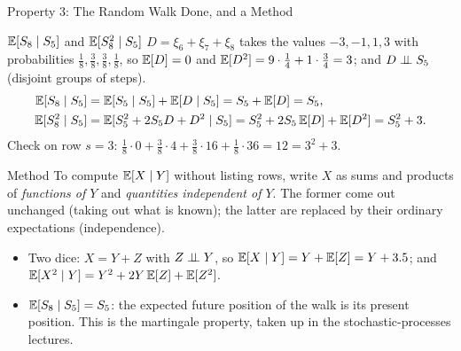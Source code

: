 \begin{frame}{Property 3: The Random Walk Done, and a Method}
  \small
  \label{rwdone}%
  \begin{exampleblock}{$\mathbb{E}[S_8\mid S_5]$ and $\mathbb{E}[S_8^2\mid S_5]$}
    $D=\xi_6+\xi_7+\xi_8$ takes the values $-3,-1,1,3$ with probabilities $\tfrac18,\tfrac38,\tfrac38,\tfrac18$, so $\mathbb{E}[D]=0$ and $\mathbb{E}[D^2]=9\cdot\tfrac14+1\cdot\tfrac34=3$; and $D\perp\!\!\!\perp S_5$ (disjoint groups of steps).
    \begin{align*}
      \mathbb{E}[S_8\mid S_5]&=\mathbb{E}[S_5\mid S_5]+\mathbb{E}[D\mid S_5]=S_5+\mathbb{E}[D]=S_5,\\
      \mathbb{E}[S_8^2\mid S_5]&=\mathbb{E}[S_5^2+2S_5D+D^2\mid S_5]=S_5^2+2S_5\,\mathbb{E}[D]+\mathbb{E}[D^2]=S_5^2+3 .
    \end{align*}
    Check on row $s=3$: $\tfrac18\cdot0+\tfrac38\cdot4+\tfrac38\cdot16+\tfrac18\cdot36=12=3^2+3$.
  \end{exampleblock}
  \begin{block}{Method}
    To compute $\mathbb{E}[X\mid Y]$ without listing rows, write $X$ as sums and products of \emph{functions of $Y$} and \emph{quantities independent of $Y$}. The former come out unchanged (taking out what is known); the latter are replaced by their ordinary expectations (independence).
  \end{block}
  \begin{itemize}
    \item Two dice: $X=Y+Z$ with $Z\perp\!\!\!\perp Y$, so $\mathbb{E}[X\mid Y]=Y+\mathbb{E}[Z]=Y+3.5$; and $\mathbb{E}[X^2\mid Y]=Y^2+2Y\,\mathbb{E}[Z]+\mathbb{E}[Z^2]$.
    \item $\mathbb{E}[S_8\mid S_5]=S_5$: the expected future position of the walk is its present position. This is the martingale property, taken up in the stochastic-processes lectures.
  \end{itemize}
\end{frame}

